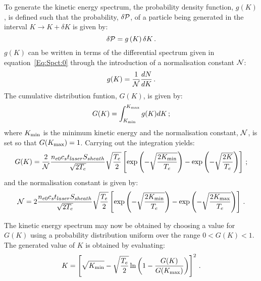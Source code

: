 To generate the kinetic energy spectrum, the probability density
function, $g(K)$, is defined such that the probability,
$\delta {\cal P}$, of a particle being generated in the interval
$K \rightarrow K + \delta K$ is given
by:
\begin{equation}
   \delta {\cal P} = g \left( K \right) \delta K \, .
\end{equation}
$g(K)$ can be written in terms of the differential spectrum
given in equation~\ref{Eq:Spct:0} through the introduction of a
normalisation constant ${\cal N}$:
\begin{equation}
  g(K) = \frac{1}{\cal N} \frac{dN}{dK} \, .
\end{equation}
The cumulative distribution funtion, $G(K)$, is given by:
\begin{equation}
  G(K) = \int_{K_{\rm min}}^{K_{\rm max}} g(K)
                                               dK \,;
\end{equation}
where $K_{\rm min}$ is the minimum kinetic energy and the
normalisation constant, ${\cal N}$, is set so that
$G(K_{\rm max}) = 1$.
Carrying out the integration yields:
\begin{equation}
  G(K) = \frac{2}{\cal N}
                   \frac{n_{e0} c_{s} t_{laser} S_{sheath}} {\sqrt{2T_{e}}}
                   \sqrt{\frac{T_{e}}{2}}
                   \left[
                         \exp\left(
                                   -\sqrt{\frac{2K_{\rm min}}{T_{e}}}
                             \right) -
                         \exp\left(
                                   -\sqrt{\frac{2K}{T_{e}}}
                             \right)
                   \right] \, ;
  \label{Eq:Src:GofK}
\end{equation}
and the normalisation constant is given by:
\begin{equation}
  {\cal N} = 2
             \frac{n_{e0} c_{s} t_{laser} S_{sheath}} {\sqrt{2T_{e}}}
             \sqrt{\frac{T_{e}}{2}}
             \left[
                   \exp\left(
                             -\sqrt{\frac{2K_{\rm min}}{T_{e}}}
                             \right) -
                         \exp\left(
                                   -\sqrt{\frac{2K_{\rm max}}{T_{e}}}
                              \right)
             \right] \, .
  \label{Eq:Src:calN}
\end{equation}

The kinetic energy spectrum may now be obtained by choosing a value
for $G(K)$ using a probability distribution uniform over the
range $0 < G(K) < 1$.
The generated value of $K$ is obtained by evaluating:
\begin{equation}
  K = \left[ \sqrt{K_{\rm min}} - \sqrt{\frac{T_e}{2}}
             \ln \left( 1 - \frac{G(K)}{G(K_{\rm max})} \right)
      \right]^2 \, .
  \label{Eq:Src:K}
\end{equation}

